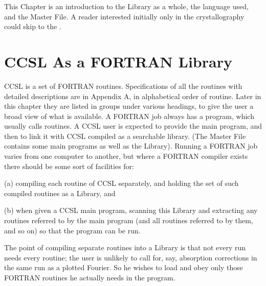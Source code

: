 %
\startdocument
\label{chap:2}
\par  
This Chapter is an introduction to the Library as a whole,  the language
used, and the Master File.  A reader interested initially only in the
crystallography could skip to the 
.
\section{CCSL As a FORTRAN Library}
CCSL is a set of FORTRAN routines.  Specifications of all
the routines with detailed descriptions are in Appendix A, in alphabetical
order of routine.  Later in this chapter they are listed in groups under
various headings, to give the user a broad view of what is available.
\p
A FORTRAN job always has a  program, which usually calls routines. A
CCSL user is expected to provide the main program, and then to link it with
CCSL compiled as a searchable library.  (The Master File contains some  
main programs as well as the Library).
\p 
Running a FORTRAN job varies from one computer to another, but
where a FORTRAN compiler exists there should be some sort of facilities
for:
\p 
\begin{list} {} {\setlength{\labelwidth}{2 cm}
  \setlength{\parsep}{-1ex}
  \setlength{\leftmargin}{\labelwidth}
 \addtolength{\leftmargin}{5mm}}
\item[(a) \hfill] compiling each routine of CCSL separately, and holding the set of
       such compiled routines as a Library, and
\item[(b) \hfill] when given a CCSL main program, scanning this Library and
       extracting any routines referred to by the main program (and all
       routines referred to by them, and so on) so that the program can be
       run.\end{list}
The point of compiling separate routines into a Library is that not
every run needs every routine;  the user is unlikely to call for, say,
absorption corrections in the same run as a plotted Fourier.  So he
wishes to load and obey only those FORTRAN routines he actually needs in the
program.
\p 
